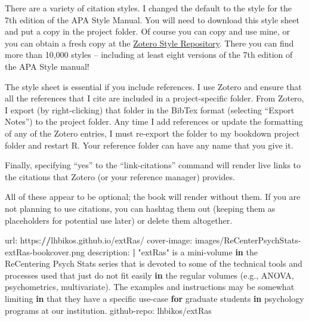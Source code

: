 \documentclass[
]{book}
\newenvironment{Shaded}{\begin{snugshade}}{\end{snugshade}}
\newcommand{\ControlFlowTok}[1]{\textcolor[rgb]{0.13,0.29,0.53}{\textbf{#1}}}
\newcommand{\ErrorTok}[1]{\textcolor[rgb]{0.64,0.00,0.00}{\textbf{#1}}}
\newcommand{\FunctionTok}[1]{\textcolor[rgb]{0.00,0.00,0.00}{#1}}
\newcommand{\NormalTok}[1]{#1}
\newcommand{\SpecialCharTok}[1]{\textcolor[rgb]{0.00,0.00,0.00}{#1}}
\newcommand{\StringTok}[1]{\textcolor[rgb]{0.31,0.60,0.02}{#1}}
\begin{document}
There are a variety of citation styles. I changed the default to the style for the 7th edition of the APA Style Manual. You will need to download this style sheet and put a copy in the project folder. Of course you can copy and use mine, or you can obtain a fresh copy at the \href{https://www.zotero.org/styles}{Zotero Style Repository}. There you can find more than 10,000 styles -- including at least eight versions of the 7th edition of the APA Style manual!

The style sheet is essential if you include references. I use Zotero and ensure that all the references that I cite are included in a project-specific folder. From Zotero, I export (by right-clicking) that folder in the BibTex format (selecting ``Export Notes'') to the project folder. Any time I add references or update the formatting of any of the Zotero entries, I must re-export the folder to my bookdown project folder and restart R. Your reference folder can have any name that you give it.

Finally, specifying ``yes'' to the ``link-citations'' command will render live links to the citations that Zotero (or your reference manager) provides.

All of these appear to be optional; the book will render without them. If you are not planning to use citations, you can hashtag them out (keeping them as placeholders for potential use later) or delete them altogether.

\begin{Shaded}
\begin{Highlighting}[]
\NormalTok{url}\SpecialCharTok{:}\NormalTok{ https}\SpecialCharTok{:}\ErrorTok{//}\NormalTok{lhbikos.github.io}\SpecialCharTok{/}\NormalTok{extRas}\SpecialCharTok{/} 
\NormalTok{cover}\SpecialCharTok{{-}}\NormalTok{image}\SpecialCharTok{:}\NormalTok{ images}\SpecialCharTok{/}\NormalTok{ReCenterPsychStats}\SpecialCharTok{{-}}\NormalTok{extRas}\SpecialCharTok{{-}}\NormalTok{bookcover.png }
\NormalTok{description}\SpecialCharTok{:} \ErrorTok{|}
  \StringTok{"extRas"}\NormalTok{ is a mini}\SpecialCharTok{{-}}\NormalTok{volume }\ControlFlowTok{in}\NormalTok{ the ReCentering Psych Stats series that is devoted to some of the technical tools and processes used that just do not fit easily }\ControlFlowTok{in}\NormalTok{ the regular }\FunctionTok{volumes}\NormalTok{ (e.g., ANOVA, psychometrics, multivariate). The examples and instructions may be somewhat limiting }\ControlFlowTok{in}\NormalTok{ that they have a specific use}\SpecialCharTok{{-}}\NormalTok{case }\ControlFlowTok{for}\NormalTok{ graduate students }\ControlFlowTok{in}\NormalTok{ psychology programs at our institution.}
\NormalTok{github}\SpecialCharTok{{-}}\NormalTok{repo}\SpecialCharTok{:}\NormalTok{ lhbikos}\SpecialCharTok{/}\NormalTok{extRas}
\end{Highlighting}
\end{Shaded}
\end{document}
